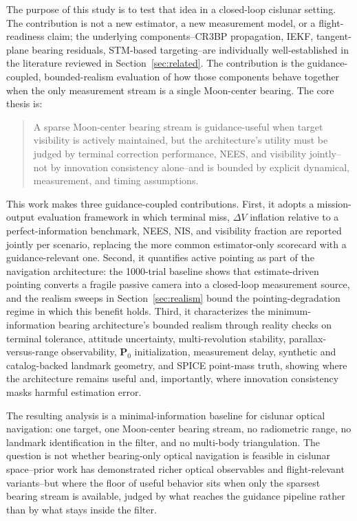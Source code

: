 \documentclass[10pt,twocolumn]{article}
\newcommand{\vect}[1]{\mathbf{#1}}
\begin{document}
The purpose of this study is to test that idea in a closed-loop cislunar setting.  The contribution is not a new estimator, a new measurement model, or a flight-readiness claim; the underlying components--CR3BP propagation, IEKF, tangent-plane bearing residuals, STM-based targeting--are individually well-established in the literature reviewed in Section~\ref{sec:related}.  The contribution is the guidance-coupled, bounded-realism evaluation of how those components behave together when the only measurement stream is a single Moon-center bearing.  The core thesis is:
\begin{quote}
A sparse Moon-center bearing stream is guidance-useful when target visibility is actively maintained, but the architecture's utility must be judged by terminal correction performance, NEES, and visibility jointly--not by innovation consistency alone--and is bounded by explicit dynamical, measurement, and timing assumptions.
\end{quote}
This work makes three guidance-coupled contributions.  First, it adopts a mission-output evaluation framework in which terminal miss, $\Delta V$ inflation relative to a perfect-information benchmark, NEES, NIS, and visibility fraction are reported jointly per scenario, replacing the more common estimator-only scorecard with a guidance-relevant one.  Second, it quantifies active pointing as part of the navigation architecture: the 1000-trial baseline shows that estimate-driven pointing converts a fragile passive camera into a closed-loop measurement source, and the realism sweeps in Section~\ref{sec:realism} bound the pointing-degradation regime in which this benefit holds.  Third, it characterizes the minimum-information bearing architecture's bounded realism through reality checks on terminal tolerance, attitude uncertainty, multi-revolution stability, parallax-versus-range observability, $\vect{P}_0$ initialization, measurement delay, synthetic and catalog-backed landmark geometry, and SPICE point-mass truth, showing where the architecture remains useful and, importantly, where innovation consistency masks harmful estimation error.

The resulting analysis is a minimal-information baseline for cislunar optical navigation: one target, one Moon-center bearing stream, no radiometric range, no landmark identification in the filter, and no multi-body triangulation.  The question is not whether bearing-only optical navigation is feasible in cislunar space--prior work has demonstrated richer optical observables and flight-relevant variants--but where the floor of useful behavior sits when only the sparsest bearing stream is available, judged by what reaches the guidance pipeline rather than by what stays inside the filter.
\end{document}
